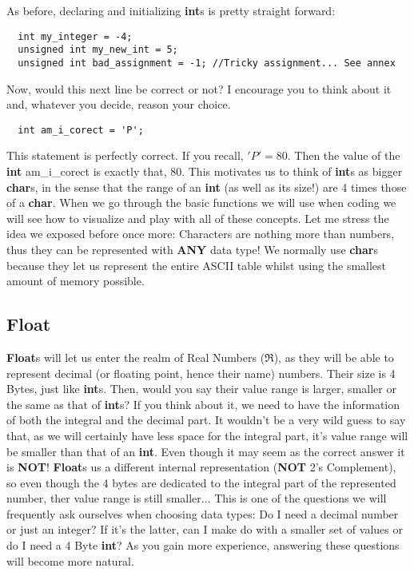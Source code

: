 \documentclass[12pt]{book}
\begin{document}
As before, declaring and initializing \textbf{int}s is pretty straight forward:

\begin{verbatim}
  int my_integer = -4;
  unsigned int my_new_int = 5;
  unsigned int bad_assignment = -1; //Tricky assignment... See annex
\end{verbatim}

Now, would this next line be correct or not? I encourage you to think about it and, whatever you decide, reason your choice.

\begin{verbatim}
  int am_i_corect = 'P';
\end{verbatim}

This statement is perfectly correct. If you recall, $'P' = 80$. Then the value of the \textbf{int} am\_i\_corect is exactly that, 80. This motivates us to think of \textbf{int}s as bigger \textbf{char}s, in the sense that the range of an \textbf{int} (as well as its size!) are 4 times those of a \textbf{char}. When we go through the basic functions we will use when coding we will see how to visualize and play with all of these concepts. Let me stress the idea we exposed before once more: Characters are nothing more than numbers, thus they can be represented with \textbf{ANY} data type! We normally use \textbf{char}s because they let us represent the entire ASCII table whilst using the smallest amount of memory possible.


\subsection{Float}

\textbf{Float}s will let us enter the realm of Real Numbers ($\Re$), as they will be able to represent decimal (or floating point, hence their name) numbers. Their size is 4 Bytes, just like \textbf{int}s. Then, would you say their value range is larger, smaller or the same as that of \textbf{int}s? If you think about it, we need to have the information of both the integral and the decimal part. It wouldn't be a very wild guess to say that, as we will certainly have less space for the integral part, it's value range will be smaller than that of an \textbf{int}. Even though it may seem as the correct answer it is \textbf{NOT}! \textbf{Float}s us a different internal representation (\textbf{NOT} 2's Complement), so even though the 4 bytes are dedicated to the integral part of the represented number, ther value range is still smaller... This is one of the questions we will frequently ask ourselves when choosing data types: Do I need a decimal number or just an integer? If it's the latter, can I make do with a smaller set of values or do I need a 4 Byte \textbf{int}? As you gain more experience, answering these questions will become more natural.
\end{document}
